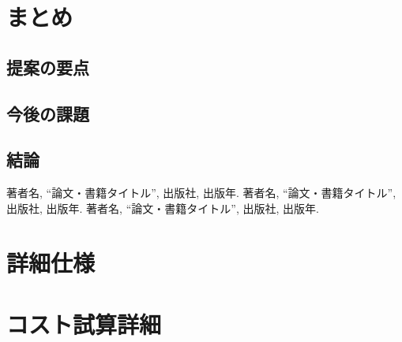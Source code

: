 \documentclass[12pt,a4paper]{jsarticle}
\begin{document}
\section{まとめ}

\subsection{提案の要点}

\subsection{今後の課題}

\subsection{結論}

\begin{thebibliography}{9}
 著者名, ``論文・書籍タイトル'', 出版社, 出版年.
 著者名, ``論文・書籍タイトル'', 出版社, 出版年.
 著者名, ``論文・書籍タイトル'', 出版社, 出版年.
\end{thebibliography}

\appendix
\section{詳細仕様}

\section{コスト試算詳細}
\end{document}

